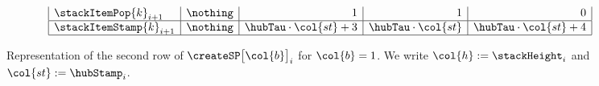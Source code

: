 \begin{figure}[h!]
\[\begin{array}{|l|c|r|r|r|}
	\stackItemPop{k}_{i + 1}                                & \nothing                           & 1                                  & 1                                  & 0                                  \\ \hline
	\stackItemStamp{k}_{i + 1}                              & \nothing                           & \hubTau \cdot \col{st} + 3         & \hubTau \cdot \col{st}             & \hubTau \cdot \col{st} + 4         \\ \hline
	\end{array}
\]
\label{fig: create2 stack pattern}
\caption{%
Representation of the second row of $\createSP\big[\col{b}\big]_{i}$ for $\col{b} = 1$.
We write $\col{h} := \stackHeight_{i}$ and $\col{st} := \hubStamp_{i}$.}
\end{figure}
